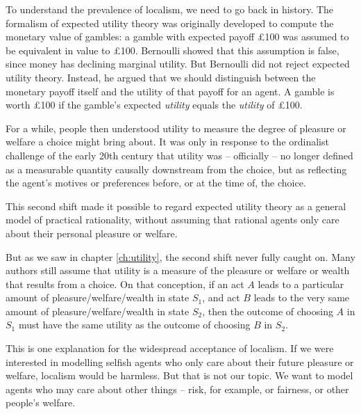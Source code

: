 To understand the prevalence of localism, we need to go back in
history. The formalism of expected utility theory was originally
developed to compute the monetary value of gambles: a gamble with
expected payoff £100 was assumed to be equivalent in value to £100.
Bernoulli showed that this assumption is false, since money has
declining marginal utility. But Bernoulli did not reject expected
utility theory. Instead, he argued that we should distinguish between
the monetary payoff itself and the utility of that payoff for an
agent. A gamble is worth £100 if the gamble's expected \emph{utility}
equals the \emph{utility} of £100.

For a while, people then understood utility to measure the degree of
pleasure or welfare a choice might bring about. It was only in
response to the ordinalist challenge of the early 20th century that
utility was -- officially -- no longer defined as a measurable
quantity causally downstream from the choice, but as reflecting the
agent's motives or preferences before, or at the time of, the choice.

This second shift made it possible to regard expected utility theory
as a general model of practical rationality, without assuming that
rational agents only care about their personal pleasure or welfare.

But as we saw in chapter \ref{ch:utility}, the second shift never
fully caught on. Many authors still assume that utility is a measure
of the pleasure or welfare or wealth that results from a choice. On
that conception, if an act $A$ leads to a particular amount of
pleasure/welfare/wealth in state $S_1$, and act $B$ leads to
the very same amount of pleasure/welfare/wealth in state $S_2$, then
the outcome of choosing $A$ in $S_1$ must have the same utility as the
outcome of choosing $B$ in $S_2$.

This is one explanation for the widespread acceptance of localism. If
we were interested in modelling selfish agents who only care about
their future pleasure or welfare, localism would be harmless. But that
is not our topic. We want to model agents who may care about other
things -- risk, for example, or fairness, or other people's welfare.

